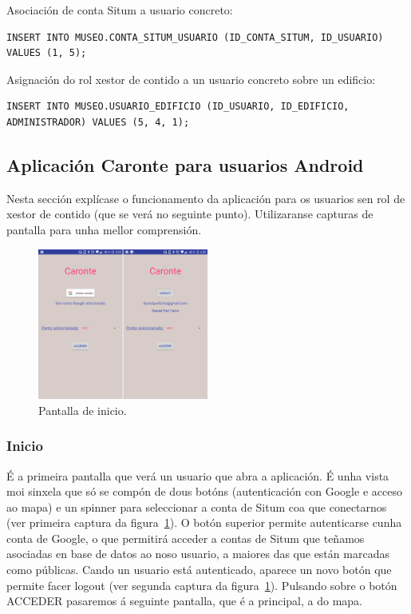 Asociación de conta Situm a usuario concreto:
\begin{lstlisting}
INSERT INTO MUSEO.CONTA_SITUM_USUARIO (ID_CONTA_SITUM, ID_USUARIO) VALUES (1, 5);
\end{lstlisting}

Asignación do rol xestor de contido a un usuario concreto sobre un edificio:
\begin{lstlisting}
INSERT INTO MUSEO.USUARIO_EDIFICIO (ID_USUARIO, ID_EDIFICIO, ADMINISTRADOR) VALUES (5, 4, 1);
\end{lstlisting}


\subsection{Aplicación Caronte para usuarios Android}
Nesta sección explícase o funcionamento da aplicación para os usuarios sen rol de xestor de contido (que se verá no seguinte punto). Utilizaranse capturas de pantalla para unha mellor comprensión.

\begin{figure}[h]
	\begin{center}
		\includegraphics[width=0.5\textwidth]{figures/android/capturaInicio}
		\caption{Pantalla de inicio.}
		\label{fig:capturaInicio}
	\end{center}
\end{figure}

\subsubsection{Inicio}
É a primeira pantalla que verá un usuario que abra a aplicación. É unha vista moi sinxela que só se compón de dous botóns (autenticación con Google e acceso ao mapa) e un spinner para seleccionar a conta de Situm coa que conectarnos (ver primeira captura da figura~\ref{fig:capturaInicio}). O botón superior permite autenticarse cunha conta de Google, o que permitirá acceder a contas de Situm que teñamos asociadas en base de datos ao noso usuario, a maiores das que están marcadas como públicas. Cando un usuario está autenticado, aparece un novo botón que permite facer logout (ver segunda captura da figura~\ref{fig:capturaInicio}). Pulsando sobre o botón ACCEDER pasaremos á seguinte pantalla, que é a principal, a do mapa.

